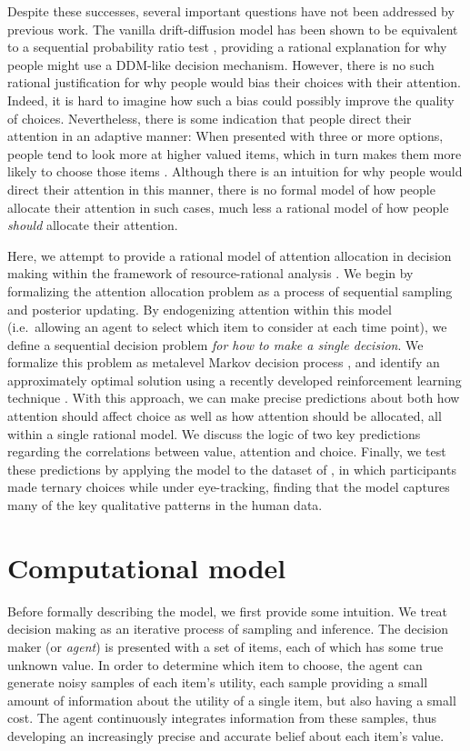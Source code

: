 \documentclass[12pt,a4paperpaper,]{article}
\begin{document}
Despite these successes, several important questions have not been addressed by previous work. The vanilla drift-diffusion model has been shown to be equivalent to a sequential probability ratio test \citep{Bogacz2006,Bitzer2014}, providing a rational explanation for why people might use a DDM-like decision mechanism. However, there is no such rational justification for why people would bias their choices with their attention. Indeed, it is hard to imagine how such a bias could possibly improve the quality of choices. Nevertheless, there is some indication that people direct their attention in an adaptive manner: When presented with three or more options, people tend to look more at higher valued items, which in turn makes them more likely to choose those items \citep{Krajbich2011}. Although there is an intuition for why people would direct their attention in this manner, there is no formal model of how people allocate their attention in such cases, much less a rational model of how people \emph{should} allocate their attention.

Here, we attempt to provide a rational model of attention allocation in decision making within the framework of resource-rational analysis \citep{griffiths15}. We begin by formalizing the attention allocation problem as a process of sequential sampling and posterior updating. By endogenizing attention within this model (i.e.~allowing an agent to select which item to consider at each time point), we define a sequential decision problem \emph{for how to make a single decision}. We formalize this problem as metalevel Markov decision process \citep{Hay2012}, and identify an approximately optimal solution using a recently developed reinforcement learning technique \citep{callaway2018learning}. With this approach, we can make precise predictions about both how attention should affect choice as well as how attention should be allocated, all within a single rational model. We discuss the logic of two key predictions regarding the correlations between value, attention and choice. Finally, we test these predictions by applying the model to the dataset of \citet{Krajbich2011}, in which participants made ternary choices while under eye-tracking, finding that the model captures many of the key qualitative patterns in the human data.


\section{Computational model}

Before formally describing the model, we first provide some intuition. We treat decision making as an iterative process of sampling and inference. The decision maker (or \emph{agent}) is presented with a set of items, each of which has some true unknown value. In order to determine which item to choose, the agent can generate noisy samples of each item's utility, each sample providing a small amount of information about the utility of a single item, but also having a small cost. The agent continuously integrates information from these samples, thus developing an increasingly precise and accurate belief about each item's value.
\end{document}
